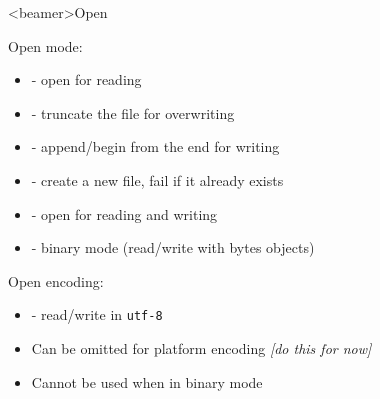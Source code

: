 
\begin{frame}<beamer>{Open}

  Open mode:

  \begin{itemize}
    \item<2->  - open for reading
    \item<3->  - truncate the file for overwriting
    \item<4->  - append/begin from the end for writing
    \item<5->  - create a new file, fail if it already exists
    \item<6->  - open for reading and writing
    \item<7->  - binary mode (read/write with bytes objects)
  \end{itemize}

  \bigskip

   Open encoding:

  \begin{itemize}
    \item<9->  - read/write in \texttt{utf-8}
    \item<10-> Can be omitted for platform encoding \textit{[do this for now]}
    \item<11-> Cannot be used when in binary mode
  \end{itemize}

\end{frame}



